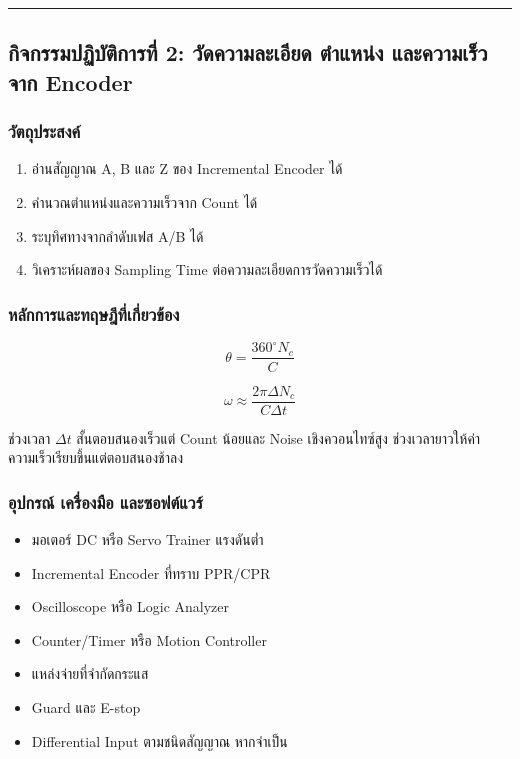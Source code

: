 \par\noindent\rule{\textwidth}{0.4pt}\par

\subsection{กิจกรรมปฏิบัติการที่ 2: วัดความละเอียด ตำแหน่ง และความเร็วจาก Encoder}

\subsubsection{วัตถุประสงค์}

\begin{enumerate}
    \item อ่านสัญญาณ A, B และ Z ของ Incremental Encoder ได้
    \item คำนวณตำแหน่งและความเร็วจาก Count ได้
    \item ระบุทิศทางจากลำดับเฟส A/B ได้
    \item วิเคราะห์ผลของ Sampling Time ต่อความละเอียดการวัดความเร็วได้
\end{enumerate}

\subsubsection{หลักการและทฤษฎีที่เกี่ยวข้อง}

\[
\theta=\frac{360^\circ N_c}{C}
\]

\[
\omega \approx \frac{2\pi\Delta N_c}{C\Delta t}
\]

ช่วงเวลา $\Delta t$ สั้นตอบสนองเร็วแต่ Count น้อยและ Noise เชิงควอนไทซ์สูง ช่วงเวลายาวให้ค่าความเร็วเรียบขึ้นแต่ตอบสนองช้าลง

\subsubsection{อุปกรณ์ เครื่องมือ และซอฟต์แวร์}

\begin{itemize}
    \item มอเตอร์ DC หรือ Servo Trainer แรงดันต่ำ
    \item Incremental Encoder ที่ทราบ PPR/CPR
    \item Oscilloscope หรือ Logic Analyzer
    \item Counter/Timer หรือ Motion Controller
    \item แหล่งจ่ายที่จำกัดกระแส
    \item Guard และ E-stop
    \item Differential Input ตามชนิดสัญญาณ หากจำเป็น
\end{itemize}

